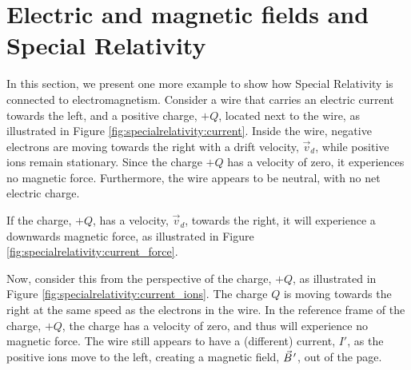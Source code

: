 \section{Electric and magnetic fields and Special Relativity}
In this section, we present one more example to show how Special Relativity is connected to electromagnetism. Consider a wire that carries an electric current towards the left, and a positive charge, $+Q$, located next to the wire, as illustrated in Figure \ref{fig:specialrelativity:current}.
Inside the wire, negative electrons are moving towards the right with a drift velocity, $\vec v_d$, while positive ions remain stationary. Since the charge $+Q$ has a velocity of zero, it experiences no magnetic force. Furthermore, the wire appears to be neutral, with no net electric charge.

If the charge, $+Q$, has a velocity, $\vec v_d$, towards the right, it will experience a downwards magnetic force, as illustrated in Figure \ref{fig:specialrelativity:current_force}.

Now, consider this from the perspective of the charge, $+Q$, as illustrated in Figure \ref{fig:specialrelativity:current_ions}. The charge $Q$ is moving towards the right at the same speed as the electrons in the wire. In the reference frame of the charge, $+Q$, the charge has a velocity of zero, and thus will experience no magnetic force. The wire still appears to have a (different) current, $I'$, as the positive ions move to the left, creating a magnetic field, $\pvec B'$, out of the page.

